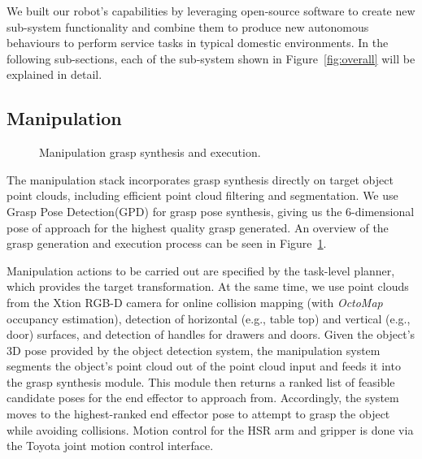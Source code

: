 \documentclass[runningheads,a4paper]{llncs}
\begin{document}
We built our robot's capabilities by leveraging open-source software to create new sub-system functionality and combine them to produce new autonomous behaviours to perform service tasks in typical domestic environments. In the following sub-sections, each of the sub-system shown in Figure~\ref{fig:overall} will be explained in detail.

\subsection{Manipulation}

\begin{figure}[!ht]
	\centering
	\vspace{-10pt}%
	\caption{Manipulation grasp synthesis and execution.}
	\label{fig:manipulation_data_flow}
	\vspace{-3ex}
\end{figure}

The manipulation stack incorporates grasp synthesis directly on target object point clouds, including efficient point cloud filtering and segmentation. We use Grasp Pose Detection(GPD) \cite{GPD1,GPD2} for grasp pose synthesis, giving us the 6-dimensional pose of approach for the highest quality grasp generated. An overview of the grasp generation and execution process can be seen in Figure~\ref{fig:manipulation_data_flow}.

Manipulation actions to be carried out are specified by the task-level planner, which provides the target transformation. At the same time, we use point clouds from the Xtion RGB-D camera for online collision mapping (with \textit{OctoMap} occupancy estimation), detection of horizontal (e.g., table top) and vertical (e.g., door) surfaces, and detection of handles for drawers and doors. Given the object's 3D pose provided by the object detection system, the manipulation system segments the object's point cloud out of the point cloud input and feeds it into the grasp synthesis module. This module then returns a ranked list of feasible candidate poses for the end effector to approach from. Accordingly, the system moves to the highest-ranked end effector pose to attempt to grasp the object while avoiding collisions. Motion control for the HSR arm and gripper is done via the Toyota joint motion control interface.
\end{document}
